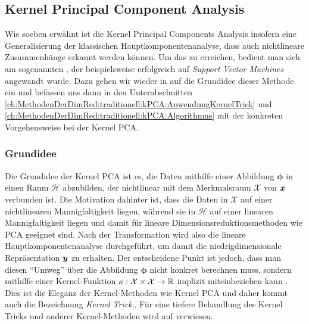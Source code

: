 \subsection{Kernel Principal Component Analysis}
\label{ch:MethodenDerDimRed:traditionell:kPCA}
Wie soeben erwähnt ist die Kernel Principal Components Analysis insofern eine Generalisierung der klassischen Hauptkomponentenanalyse, dass auch nichtlineare Zusammenhänge erkannt werden können.
Um das zu erreichen, bedient man sich am sogenannten , der beispielsweise erfolgreich auf \textit{Support Vector Machines} \parencite{Boser.1992} angewandt wurde.
Dazu gehen wir wieder in  auf die Grundidee dieser Methode ein und befassen uns dann in den Unterabschnitten \ref{ch:MethodenDerDimRed:traditionell:kPCA:AnwendungKernelTrick} und \ref{ch:MethodenDerDimRed:traditionell:kPCA:Algorithmus} mit der konkreten Vorgehensweise bei der Kernel PCA.

\subsubsection{Grundidee}
\label{ch:MethodenDerDimRed:traditionell:kPCA:Grundidee}

Die Grundidee der Kernel PCA ist es, die Daten mithilfe einer Abbildung $\bm{\phi}$ in einen Raum $\mathcal{H}$ abzubilden, der nichtlinear mit dem Merkmalsraum $\mathcal{X}$ von $\bm{x}$ verbunden ist. Die Motivation dahinter ist, dass die Daten in $\mathcal{X}$ auf einer nichtlinearen Mannigfaltigkeit liegen, während sie in $\mathcal{H}$ auf einer linearen Mannigfaltigkeit liegen und damit für lineare Dimensionsreduktionsmethoden wie PCA geeignet sind. Nach der Transformation wird also
die lineare Hauptkomponentenanalyse durchgeführt, um damit die niedrigdimensionale Repräsentation $\bm{y}$ zu erhalten. Der entscheidene Punkt ist jedoch, dass man diesen \enquote{Umweg} über die Abbildung $\bm{\phi}$ nicht konkret berechnen muss, sondern mithilfe einer Kernel-Funktion $\kappa: \mathcal{X} \times \mathcal{X} \rightarrow \mathbb{R}$ implizit miteinbeziehen kann \parencites[586 -- 588]{Bishop.2006}[583]{Scholkopf.1997}. Dies ist die Eleganz der Kernel-Methoden wie Kernel PCA und daher kommt auch die Bezeichnung \textit{Kernel Trick}.. Für eine tiefere Behandlung des Kernel Tricks und anderer Kernel-Methoden wird auf \textcite{ShaweTaylor.2011}
verwiesen.


